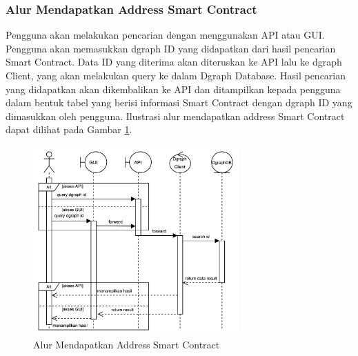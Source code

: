\subsubsection{Alur Mendapatkan Address Smart Contract}

Pengguna akan melakukan pencarian dengan menggunakan API atau GUI. Pengguna akan memasukkan dgraph ID yang didapatkan dari hasil pencarian Smart Contract. Data ID yang diterima akan diteruskan ke API lalu ke dgraph Client, yang akan melakukan query ke dalam Dgraph Database. Hasil pencarian yang didapatkan akan dikembalikan ke API dan ditampilkan kepada pengguna dalam bentuk tabel yang berisi informasi Smart Contract dengan dgraph ID yang dimasukkan oleh pengguna. Ilustrasi alur mendapatkan address Smart Contract dapat dilihat pada Gambar \ref{image:alur-mendapatkan-address-smart-contract}.

\begin{figure}[ht]
    \centering
    \includegraphics[width=0.7\textwidth]{resources/chapter-3/sequence-2.png}
    \caption{Alur Mendapatkan Address Smart Contract}
    \label{image:alur-mendapatkan-address-smart-contract}
\end{figure}





